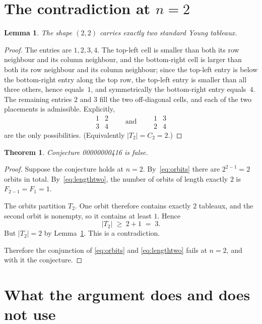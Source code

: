 \documentclass[11pt]{article}
\newtheorem{theorem}{Theorem}
\newtheorem{lemma}{Lemma}
\theoremstyle{remark}
\begin{document}
\section{The contradiction at $n=2$}

\begin{lemma}\label{lem:shape22}
The shape $(2,2)$ carries exactly two standard Young tableaux.
\end{lemma}

\begin{proof}
The entries are $1,2,3,4$. The top-left cell is smaller than both its row
neighbour and its column neighbour, and the bottom-right cell is larger than
both its row neighbour and its column neighbour; since the top-left entry is
below the bottom-right entry along the top row, the top-left entry is smaller
than all three others, hence equals~$1$, and symmetrically the bottom-right
entry equals~$4$. The remaining entries $2$ and $3$ fill the two off-diagonal
cells, and each of the two placements is admissible. Explicitly,
\[
  \begin{array}{cc} 1 & 2 \\ 3 & 4 \end{array}
  \qquad\text{and}\qquad
  \begin{array}{cc} 1 & 3 \\ 2 & 4 \end{array}
\]
are the only possibilities. (Equivalently $|T_2| = C_2 = 2$.)
\end{proof}

\begin{theorem}\label{thm:main}
Conjecture 00000000416 is false.
\end{theorem}

\begin{proof}
Suppose the conjecture holds at $n=2$. By~\eqref{eq:orbits} there are
$2^{2-1} = 2$ orbits in total. By~\eqref{eq:lengthtwo}, the number of orbits of
length exactly $2$ is $F_{2-1} = F_1 = 1$.

The orbits partition $T_2$. One orbit therefore contains exactly $2$ tableaux,
and the second orbit is nonempty, so it contains at least $1$. Hence
\[
  |T_2| \;\ge\; 2 + 1 \;=\; 3.
\]
But $|T_2| = 2$ by Lemma~\ref{lem:shape22}. This is a contradiction.

Therefore the conjunction of \eqref{eq:orbits} and \eqref{eq:lengthtwo} fails
at $n=2$, and with it the conjecture.
\end{proof}

\section{What the argument does and does not use}
\end{document}
